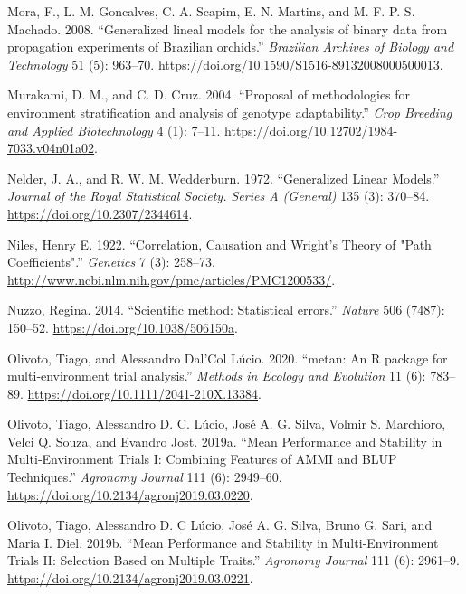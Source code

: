 \documentclass[
]{book}
\numberwithin{equation}{section}
\newlength{\cslhangindent}
\newenvironment{cslreferences}%
  {\setlength{\parindent}{0pt}%
  \everypar{\setlength{\hangindent}{\cslhangindent}}\ignorespaces}%
  {\par}
\begin{document}
\begin{cslreferences}
\leavevmode\hypertarget{ref-Mora2008}{}%
Mora, F., L. M. Goncalves, C. A. Scapim, E. N. Martins, and M. F. P. S. Machado. 2008. ``Generalized lineal models for the analysis of binary data from propagation experiments of Brazilian orchids.'' \emph{Brazilian Archives of Biology and Technology} 51 (5): 963--70. \url{https://doi.org/10.1590/S1516-89132008000500013}.

\leavevmode\hypertarget{ref-murakami2004}{}%
Murakami, D. M., and C. D. Cruz. 2004. ``Proposal of methodologies for environment stratification and analysis of genotype adaptability.'' \emph{Crop Breeding and Applied Biotechnology} 4 (1): 7--11. \url{https://doi.org/10.12702/1984-7033.v04n01a02}.

\leavevmode\hypertarget{ref-Nelder1972}{}%
Nelder, J. A., and R. W. M. Wedderburn. 1972. ``Generalized Linear Models.'' \emph{Journal of the Royal Statistical Society. Series A (General)} 135 (3): 370--84. \url{https://doi.org/10.2307/2344614}.

\leavevmode\hypertarget{ref-Niles1922}{}%
Niles, Henry E. 1922. ``Correlation, Causation and Wright's Theory of "Path Coefficients".'' \emph{Genetics} 7 (3): 258--73. \url{http://www.ncbi.nlm.nih.gov/pmc/articles/PMC1200533/}.

\leavevmode\hypertarget{ref-Nuzzo2014}{}%
Nuzzo, Regina. 2014. ``Scientific method: Statistical errors.'' \emph{Nature} 506 (7487): 150--52. \url{https://doi.org/10.1038/506150a}.

\leavevmode\hypertarget{ref-Olivoto2020a}{}%
Olivoto, Tiago, and Alessandro Dal'Col Lúcio. 2020. ``metan: An R package for multi‐environment trial analysis.'' \emph{Methods in Ecology and Evolution} 11 (6): 783--89. \url{https://doi.org/10.1111/2041-210X.13384}.

\leavevmode\hypertarget{ref-Olivoto2019}{}%
Olivoto, Tiago, Alessandro D. C. Lúcio, José A. G. Silva, Volmir S. Marchioro, Velci Q. Souza, and Evandro Jost. 2019a. ``Mean Performance and Stability in Multi‐Environment Trials I: Combining Features of AMMI and BLUP Techniques.'' \emph{Agronomy Journal} 111 (6): 2949--60. \url{https://doi.org/10.2134/agronj2019.03.0220}.

\leavevmode\hypertarget{ref-Olivoto2019a}{}%
Olivoto, Tiago, Alessandro D. C Lúcio, José A. G. Silva, Bruno G. Sari, and Maria I. Diel. 2019b. ``Mean Performance and Stability in Multi‐Environment Trials II: Selection Based on Multiple Traits.'' \emph{Agronomy Journal} 111 (6): 2961--9. \url{https://doi.org/10.2134/agronj2019.03.0221}.


\end{cslreferences}
\end{document}
